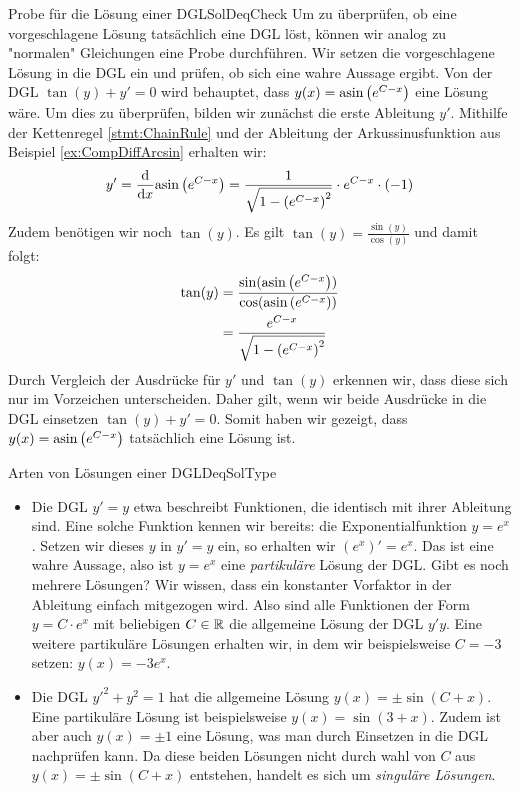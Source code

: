 \begin{example}{Probe für die Lösung einer DGL}{SolDeqCheck}
    Um zu überprüfen, ob eine vorgeschlagene Lösung tatsächlich eine DGL löst, können wir analog zu "normalen" Gleichungen eine Probe durchführen. Wir setzen die vorgeschlagene Lösung in die DGL ein und prüfen, ob sich eine wahre Aussage ergibt. Von der DGL $\tan(y) + y' = 0$  wird behauptet, dass $y(x) =  \text{asin}\left(e^{C-x}\right)$ eine Lösung wäre. Um dies zu überprüfen, bilden wir zunächst die erste Ableitung $y'$. Mithilfe der Kettenregel \ref{stmt:ChainRule} und der Ableitung der Arkussinusfunktion aus Beispiel \ref{ex:CompDiffArcsin} erhalten wir:
    $$
        y' = \frac{\mathrm{d}{}}{\mathrm{d}{x}} \text{asin}\left(e^{C-x}\right) = \frac{1}{\sqrt{1-\left(e^{C-x}\right)^2}} \cdot e^{C-x} \cdot (-1)
    $$
    Zudem benötigen wir noch $\tan(y)$. Es gilt $\tan(y) = \frac{\sin(y)}{\cos(y)}$ und damit folgt:
    \begin{alignat*}{1}
        \tan(y) &= \frac{\sin(\text{asin}\left(e^{C-x}\right))}{\cos(\text{asin}\left(e^{C-x}\right))} \\
                &= \frac{e^{C-x}}{\sqrt{1-\left(e^{C-x}\right)^2}}
    \end{alignat*}
    Durch Vergleich der Ausdrücke für $y'$ und $\tan(y)$ erkennen wir, dass diese sich nur im Vorzeichen unterscheiden. Daher gilt, wenn wir beide Ausdrücke in die DGL einsetzen $\tan(y) + y' = 0$. Somit haben wir gezeigt, dass $y(x) =  \text{asin}\left(e^{C-x}\right)$ tatsächlich eine Lösung ist.
\end{example}

\begin{example}{Arten von Lösungen einer DGL}{DeqSolType}
    \begin{itemize}
        \item Die DGL $y'=y$ etwa beschreibt Funktionen, die identisch mit ihrer Ableitung sind. Eine solche Funktion kennen wir bereits: die Exponentialfunktion $y=e^x$. Setzen wir dieses $y$ in $y'=y$ ein, so erhalten wir $(e^x)'=e^x$. Das ist eine wahre Aussage, also ist $y=e^x$ eine \emph{partikuläre} Lösung der DGL. Gibt es noch mehrere Lösungen? Wir wissen, dass ein konstanter Vorfaktor in der Ableitung einfach mitgezogen wird. Also sind alle Funktionen der Form $y=C\cdot e^x$ mit beliebigen $C\in\mathbb{R}$ die allgemeine Lösung der DGL $y'y$. Eine weitere partikuläre Lösungen erhalten wir, in dem wir beispielsweise $C=-3$ setzen: $y(x) = -3 e^x$.
        \item Die DGL $y'^2 + y^2 = 1$ hat die allgemeine Lösung $y(x) = \pm \sin(C+x)$. Eine partikuläre Lösung ist beispielsweise $y(x) = \sin(3+x)$. Zudem ist aber auch $y(x) = \pm 1$ eine Lösung, was man durch Einsetzen in die DGL nachprüfen kann. Da diese beiden Lösungen nicht durch wahl von $C$ aus  $y(x) = \pm \sin(C+x)$ entstehen, handelt es sich um \emph{singuläre Lösungen}.
    \end{itemize}
\end{example}

